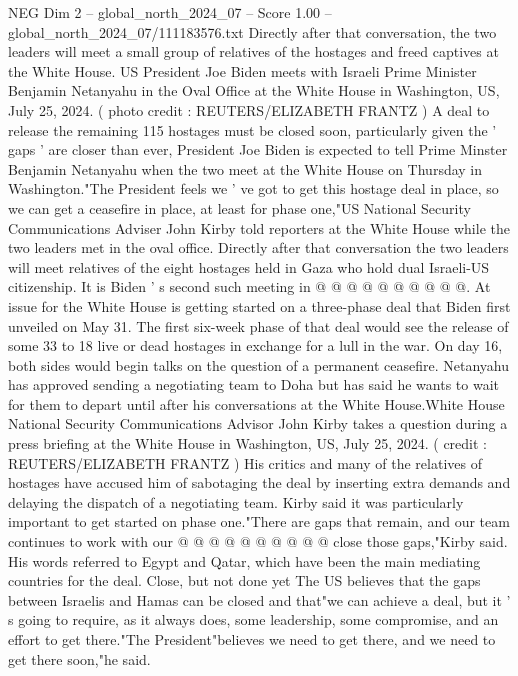 \begin{textsample}{NEG Dim 2 – global\_north\_2024\_07 – Score 1.00 – global\_north\_2024\_07/111183576.txt}  \label{ex:f2_neg_068}
Directly after that conversation, the two leaders will meet a small group of relatives of the hostages and freed captives at the White House.
US President Joe Biden meets with Israeli Prime Minister Benjamin Netanyahu in the Oval Office at the White House in Washington, US, July 25, 2024. ( photo credit : REUTERS/ELIZABETH FRANTZ ) A deal to release the remaining 115 hostages must be closed soon, particularly given the ' gaps ' are closer than ever, President Joe Biden is expected to tell Prime Minster Benjamin Netanyahu when the two meet at the White House on Thursday in Washington."The President feels we ' ve got to get this hostage deal in place, so we can get a ceasefire in place, at least for phase one,"US National Security Communications Adviser John Kirby told reporters at the White House while the two leaders met in the oval office.
Directly after that conversation the two leaders will meet relatives of the eight hostages held in Gaza who hold dual Israeli-US citizenship.
It is Biden ' s second such meeting in @ @ @ @ @ @ @ @ @ @.
At issue for the White House is getting started on a three-phase deal that Biden first unveiled on May 31.
The first six-week phase of that deal would see the release of some 33 to 18 live or dead hostages in exchange for a lull in the war.
On day 16, both sides would begin talks on the question of a permanent ceasefire.
Netanyahu has approved sending a negotiating team to Doha but has said he wants to wait for them to depart until after his conversations at the White House.White House National Security Communications Advisor John Kirby takes a question during a press briefing at the White House in Washington, US, July 25, 2024. ( credit : REUTERS/ELIZABETH FRANTZ ) His critics and many of the relatives of hostages have accused him of sabotaging the deal by inserting extra demands and delaying the dispatch of a negotiating team.
Kirby said it was particularly important to get started on phase one."There are gaps that remain, and our team continues to work with our @ @ @ @ @ @ @ @ @ @ close those gaps,"Kirby said.
His words referred to Egypt and Qatar, which have been the main mediating countries for the deal.
Close, but not done yet The US believes that the gaps between Israelis and Hamas can be closed and that"we can achieve a deal, but it ' s going to require, as it always does, some leadership, some compromise, and an effort to get there."The President"believes we need to get there, and we need to get there soon,"he said.

\end{textsample}
